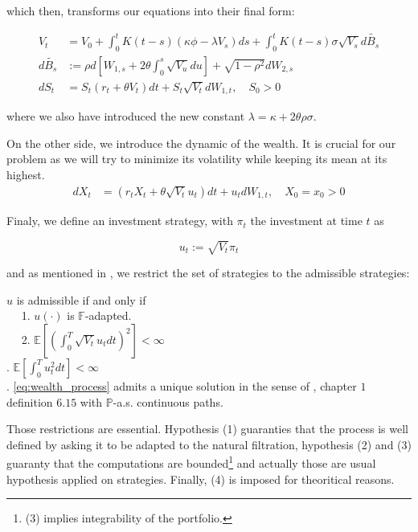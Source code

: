 which then, transforms our equations into their final form:

\begin{align}
V_t &= V_0 + \int_0^t  K(t-s) ( \kappa \phi - \lambda V_s ) ds + \int_0^t  K(t-s) \sigma \sqrt{V_s} d \widetilde{B_s}  \label{eq:original_problem1} \\
d \widetilde{B_s } &:= \rho d [ W_{1,s} + 2 \theta \int_0^s \sqrt{ V_u } du ] + \sqrt{ 1 - \rho^2 } d W_{2,s}  \label{eq:original_problem2} \\
d S_t &= S_t ( r_t + \theta V_t ) dt + S_t \sqrt{V_t} d W_{1,t}, \quad S_0 > 0 \label{eq:original_problem3}
\end{align}

where we also have introduced the new constant $ \lambda = \kappa + 2 \theta \rho \sigma$.

On the other side, we introduce the dynamic of the wealth. It is crucial for our problem as we will try to minimize its volatility while keeping its mean at its highest.
\begin{align}
\label{eq:wealth_process}
d X_t 
&= \left ( r_t X_t + \theta \sqrt{ V_t } u_t \right ) dt + u_t d W_{1,t}, \quad X_0 = x_0 > 0
\end{align}


Finaly, we define an investment strategy, with $\pi_t$ the investment at time $t$ as

\begin{equation}
u_t := \sqrt{V_t} \pi_t 
\end{equation}

and as mentioned in \cite{HanWong}, we restrict the set of strategies to the admissible strategies:

\begin{definition}
$u$ is admissible if and only if \\
$\quad$ 1. $u(\cdot)$ is $\mathbb F$-adapted.  \\
$\quad$ 2. $\mathbb E[ (\int_0^T  \sqrt {V_t} u_t dt )^2 ] < \infty$ \\
. $\mathbb E[ \int^T_0 u_t^2 dt ] < \infty $ \\
. \ref{eq:wealth_process} admits a unique solution in the sense of \cite{ref_hanwong}, chapter $1$ definition $6.15$ with $\mathbb P$-a.s. continuous paths.
\end{definition}

Those restrictions are essential. Hypothesis (1) guaranties that the process is well defined by asking it to be adapted to the natural filtration, hypothesis (2) and (3) guaranty that the computations are bounded\footnote{(3) implies integrability of the portfolio.} and actually those are usual hypothesis applied on strategies. Finally, (4) is imposed for theoritical reasons.

